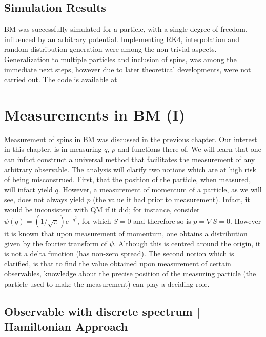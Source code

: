 \subsection{Simulation Results\label{sub:BM-Simulation-Results}}

BM was successfully simulated for a particle, with a single degree
of freedom, influenced by an arbitrary potential. Implementing RK4,
interpolation and random distribution generation were among the non-trivial
aspects. Generalization to multiple particles and inclusion of spins,
was among the immediate next steps, however due to later theoretical
developments, were not carried out. The code is available at \cite{gitHubThesisSim}


\section{Measurements in BM (I)\label{sec:Measurements-in-BM}}

Measurement of spins in BM was discussed in the previous chapter.
Our interest in this chapter, is in measuring $q$, $p$ and functions
there of. We will learn that one can infact construct a universal
method that facilitates the measurement of any arbitrary observable.
The analysis will clarify two notions which are at high risk of being
misconstrued. First, that the position of the particle, when measured,
will infact yield $q$. However, a measurement of momentum of a particle,
as we will see, does not always yield $p$ (the value it had prior
to measurement). Infact, it would be inconsistent with QM if it did;
for instance, consider $\psi(q)=\left(1/\sqrt{\pi}\right)e^{-q^{2}}$,
for which $S=0$ and therefore so is $p=\nabla S=0$. However it is
known that upon measurement of momentum, one obtains a distribution
given by the fourier transform of $\psi$. Although this is centred
around the origin, it is not a delta function (has non-zero spread).
The second notion which is clarified, is that to find the value obtained
upon measurement of certain observables, knowledge about the precise
position of the measuring particle (the particle used to make the
measurement) can play a deciding role.


\subsection{Observable with discrete spectrum | Hamiltonian Approach}

